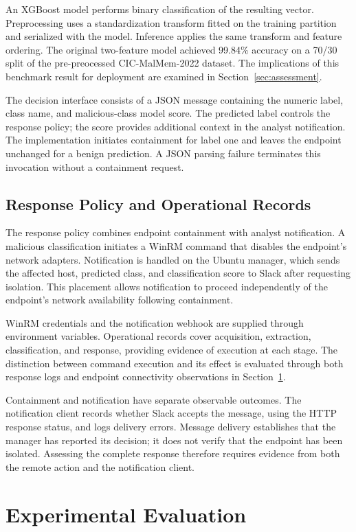 \documentclass[conference]{IEEEtran}
\begin{document}
An XGBoost model performs binary classification of the resulting vector. Preprocessing uses a standardization transform fitted on the training partition and serialized with the model. Inference applies the same transform and feature ordering. The original two-feature model achieved 99.84\% accuracy on a 70/30 split of the pre-preocessed CIC-MalMem-2022 dataset. The implications of this benchmark result for deployment are examined in Section~\ref{sec:assessment}.

The decision interface consists of a JSON message containing the numeric label, class name, and malicious-class model score. The predicted label controls the response policy; the score provides additional context in the analyst notification. The implementation initiates containment for label one and leaves the endpoint unchanged for a benign prediction. A JSON parsing failure terminates this invocation without a containment request.

\subsection{Response Policy and Operational Records}
The response policy combines endpoint containment with analyst notification. A malicious classification initiates a WinRM command that disables the endpoint's network adapters. Notification is handled on the Ubuntu manager, which sends the affected host, predicted class, and classification score to Slack after requesting isolation. This placement allows notification to proceed independently of the endpoint's network availability following containment.

WinRM credentials and the notification webhook are supplied through environment variables. Operational records cover acquisition, extraction, classification, and response, providing evidence of execution at each stage. The distinction between command execution and its effect is evaluated through both response logs and endpoint connectivity observations in Section~\ref{sec:case}.

Containment and notification have separate observable outcomes. The
notification client records whether Slack accepts the message, using the HTTP
response status, and logs delivery errors. Message delivery establishes that
the manager has reported its decision; it does not verify that the endpoint
has been isolated. Assessing the complete response therefore requires evidence
from both the remote action and the notification client.

\section{Experimental Evaluation}
\label{sec:case}
\end{document}
